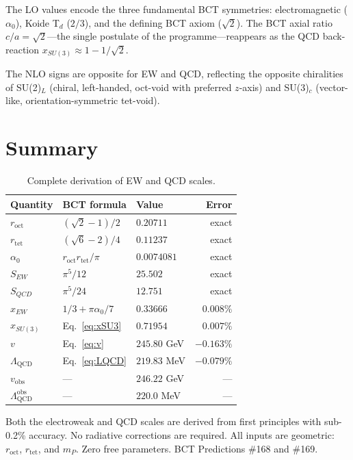 \documentclass[aps,prl,twocolumn,showpacs,preprintnumbers]{revtex4-2}
\newcommand{\roct}{r_{\mathrm{oct}}}
\newcommand{\rtet}{r_{\mathrm{tet}}}
\newcommand{\azero}{\alpha_0}
\newcommand{\mP}{m_P}
\newcommand{\LQCD}{\Lambda_{\mathrm{QCD}}}
\begin{document}
The LO values encode the three fundamental BCT symmetries:
electromagnetic ($\azero$), Koide T$_d$ ($2/3$), and the defining
BCT axiom ($\sqrt{2}$). The BCT axial ratio $c/a=\sqrt{2}$---the
single postulate of the programme---reappears as the QCD back-reaction
$x_{SU(3)} \approx 1-1/\sqrt{2}$.

The NLO signs are opposite for EW and QCD, reflecting the opposite
chiralities of SU(2)$_L$ (chiral, left-handed, oct-void with preferred
$z$-axis) and SU(3)$_c$ (vector-like, orientation-symmetric tet-void).

\section{Summary}

\begin{table}[h]
\centering
\caption{Complete derivation of EW and QCD scales.}
\label{tab:summary}
\begin{tabular}{lllr}
\toprule
Quantity & BCT formula & Value & Error \\
\midrule
$\roct$ & $(\sqrt{2}-1)/2$ & $0.20711$ & exact \\
$\rtet$ & $(\sqrt{6}-2)/4$ & $0.11237$ & exact \\
$\azero$ & $\roct\rtet/\pi$ & $0.0074081$ & exact \\
$S_{EW}$ & $\pi^5/12$ & $25.502$ & exact \\
$S_{QCD}$ & $\pi^5/24$ & $12.751$ & exact \\
$x_{EW}$ & $1/3 + \pi\azero/7$ & $0.33666$ & $0.008\%$ \\
$x_{SU(3)}$ & Eq.~\eqref{eq:xSU3} & $0.71954$ & $0.007\%$ \\
$v$ & Eq.~\eqref{eq:v} & $245.80$ GeV & $\mathbf{-0.163\%}$ \\
$\LQCD$ & Eq.~\eqref{eq:LQCD} & $219.83$ MeV & $\mathbf{-0.079\%}$ \\
\midrule
$v_{\mathrm{obs}}$ & --- & $246.22$ GeV & --- \\
$\LQCD^{\mathrm{obs}}$ & --- & $220.0$ MeV & --- \\
\bottomrule
\end{tabular}
\end{table}

Both the electroweak and QCD scales are derived from first principles
with sub-0.2\% accuracy. No radiative corrections are required.
All inputs are geometric: $\roct$, $\rtet$, and $\mP$.
Zero free parameters. BCT Predictions \#168 and \#169.
\end{document}
